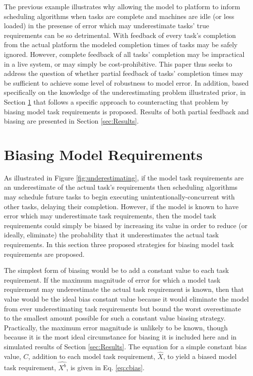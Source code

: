 \documentclass[10pt]{csce}
\begin{document}
The previous example illustrates why allowing the model to platform to
inform scheduling algorithms when tasks are complete and machines are
idle (or less loaded) in the presense of error which may underestimate tasks'
true requirements can be so detrimental.  With feedback of every task's
completion from the actual platform the modeled completion times of tasks
may be safely ignored.  However, complete feedback of all tasks' completion
may be impractical in a live system, or may simply be cost-prohibitive.
This paper thus seeks to address the question of whether partial feedback
of tasks' completion times may be sufficient to achieve some level of
robustness to model error.  In addition, based specifically on the
knowledge of the underestimating problem illustrated prior, in Section
\ref{sec:Biasing} that follows a specific approach to counteracting
that problem by biasing model task requirements is proposed.  Results of
both partial feedback and biasing are presented in Section \ref{sec:Results}.


\section{Biasing Model Requirements}
\label{sec:Biasing}

As illustrated in Figure \ref{fig:underestimating}, if the model task
requirements are an underestimate of the actual task's requirements then
scheduling algorithms may schedule future tasks to begin executing
unintentionally-concurrent with other tasks, delaying their completion.
However, if the model is known to have error which may underestimate
task requirements, then the model task requirements could simply be
biased by increasing its value in order to reduce (or ideally, eliminate)
the probability that it underestimates the actual task requirements.
In this section three proposed strategies for biasing model task
requirements are proposed.

The simplest form of biasing would be to add a constant value to each
task requirement.  If the maximum magnitude of error for which a model
task requirement may underestimate the actual task requirement is known,
then that value would be the ideal bias constant value because it would
eliminate the model from ever underestimating task requirements but
bound the worst overestimate to the smallest amount possible for such a
constant value biasing strategy.  Practically, the maximum error magnitude
is unlikely to be known, though because it is the most ideal circumstance
for biasing it is included here and in simulated results of Section
\ref{sec:Results}.  The equation for a simple constant bias value, $C$,
addition to each model task requirement, $\hat{X}$, to yield a biased
model task requirement, $\hat{X^b}$, is given in Eq.
\ref{eq:cbias}.
\end{document}
